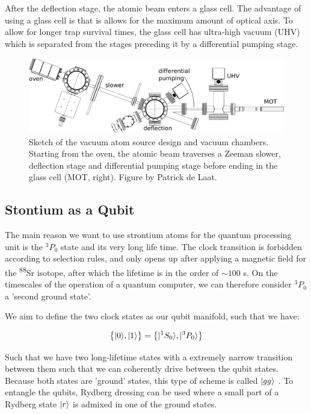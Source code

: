 After the deflection stage, the atomic beam enters a glass cell. The advantage of using a glass cell is that is allows for the maximum amount of optical axis. To allow for longer trap survival times, the glass cell has ultra-high vacuum (UHV) which is separated from the stages preceding it by a differential pumping stage. 

\begin{figure}
	\centering
	\includegraphics[width=0.9\linewidth]{figures/SrLoading.pdf}
	\caption{Sketch of the vacuum atom source design and vacuum chambers. Starting from the oven, the atomic beam traverses a Zeeman slower, deflection stage and differential pumping stage before ending in the glass cell (MOT, right). Figure by Patrick de Laat.}
	\label{fig:SrLoading}
\end{figure}

\subsection{Stontium as a Qubit}\label{sec:QubitScheme}

The main reason we want to use strontium atoms for the quantum processing unit is the ${}^3P_0$ state and its very long life time. The clock transition is forbidden according to selection rules, and only opens up after applying a magnetic field for the \textsuperscript{88}Sr isotope, after which the lifetime is in the order of $\sim 100$ s. On the timescales of the operation of a quantum computer, we can therefore consider ${}^3P_0$ a 'second ground state'. 

We aim to define the two clock states as our qubit manifold, such that we have:

\begin{equation}\label{eq:QubitManifold}
	\big\{\lvert0\rangle,\lvert1\rangle\big\} = 
	\left\{
		\lvert{}^1S_0\rangle, \lvert{}^3P_0\rangle 
	\right\}
\end{equation}

Such that we have two long-lifetime states with a extremely narrow transition between them such that we can coherently drive between the qubit states. Because both states are 'ground' states, this type of scheme is called $\lvert gg\rangle$ \cite{Wu2021}. To entangle the qubits, Rydberg dressing can be used \cite{Wu2021} where a small part of a Rydberg state $\lvert r\rangle$ is admixed in one of the ground states. 

